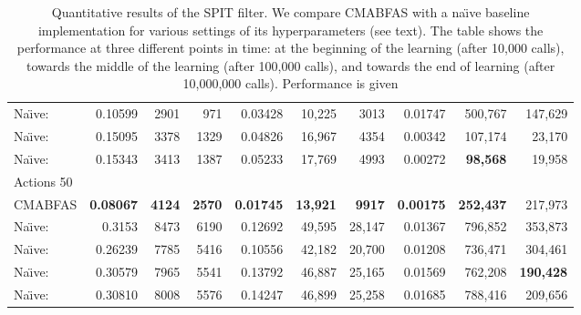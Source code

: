 \documentclass{llncs}
\begin{document}
\begin{sidewaystable}
\begin{center}
\begin{tabular}{|l|rrr|rrr|rrr|}
\hspace*{0.5cm}Na\"{\i}ve:      & 0.10599       & 2901      & 971       & 0.03428       & 10,225     & 3013       & 0.01747       & 500,767    & 147,629    \\
\hspace*{0.5cm}Na\"{\i}ve:     & 0.15095       & 3378      & 1329      & 0.04826       & 16,967     & 4354       & 0.00342       & 107,174    & 23,170     \\
\hspace*{0.5cm}Na\"{\i}ve:     & 0.15343       & 3413      & 1387      & 0.05233       & 17,769     & 4993       & 0.00272       &{\bf 98,568}& 19,958     \\
\hline
Actions 50                            &               &           &           &               &            &            &               &             &         \\
\hspace*{0.5cm}CMABFAS                & {\bf 0.08067} & {\bf 4124}& {\bf 2570}& {\bf 0.01745} &{\bf 13,921}&{\bf 9917}  & {\bf 0.00175} &{\bf 252,437}& 217,973 \\
\hspace*{0.5cm}Na\"{\i}ve:      & 0.3153        & 8473      & 6190      & 0.12692       & 49,595     & 28,147     & 0.01367       & 796,852     & 353,873 \\
\hspace*{0.5cm}Na\"{\i}ve:      & 0.26239       & 7785      & 5416      & 0.10556       & 42,182     & 20,700     & 0.01208       & 736,471     & 304,461 \\
\hspace*{0.5cm}Na\"{\i}ve:     & 0.30579       & 7965      & 5541      & 0.13792       & 46,887     & 25,165     & 0.01569       & 762,208     & {\bf 190,428} \\
\hspace*{0.5cm}Na\"{\i}ve:     & 0.30810       & 8008      & 5576      & 0.14247       & 46,899     & 25,258     & 0.01685       & 788,416     & 209,656\\
\hline
\end{tabular}
\end{center}
\caption{Quantitative results of the SPIT filter. We compare CMABFAS with a na\"{\i}ve baseline implementation for various settings of its hyperparameters (see text). The table shows the performance at three different points in time: at the beginning of the learning (after 10,000
calls), towards the middle of the learning (after 100,000 calls), and towards the end of learning (after 10,000,000 calls). Performance is given
}
\end{sidewaystable}
\end{document}

